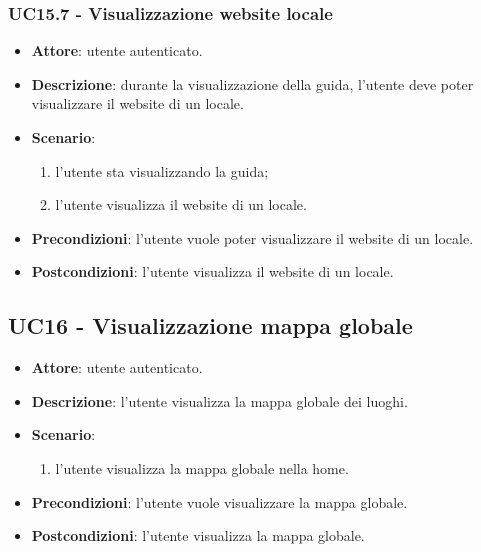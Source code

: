 \subsubsection{UC15.7 - Visualizzazione website locale}
\begin{itemize}
    \item \textbf{Attore}: utente autenticato.
    \item \textbf{Descrizione}: durante la visualizzazione della guida, l'utente deve poter visualizzare il website di un locale.
    \item \textbf{Scenario}:
    \begin{enumerate}
        \item l'utente sta visualizzando la guida;
        \item l'utente visualizza il website di un locale.
    \end{enumerate}
    \item \textbf{Precondizioni}: l'utente vuole poter visualizzare il website di un locale.
    \item \textbf{Postcondizioni}: l'utente visualizza il website di un locale.
\end{itemize}


\subsection{UC16 - Visualizzazione mappa globale}
\begin{itemize}
    \item \textbf{Attore}: utente autenticato.
    \item \textbf{Descrizione}: l'utente visualizza la mappa globale dei luoghi.
    \item \textbf{Scenario}:
    \begin{enumerate}
        \item l'utente visualizza la mappa globale nella home.
    \end{enumerate}

    \item \textbf{Precondizioni}: l'utente vuole visualizzare la mappa globale.
    \item \textbf{Postcondizioni}: l'utente visualizza la mappa globale.
\end{itemize}

